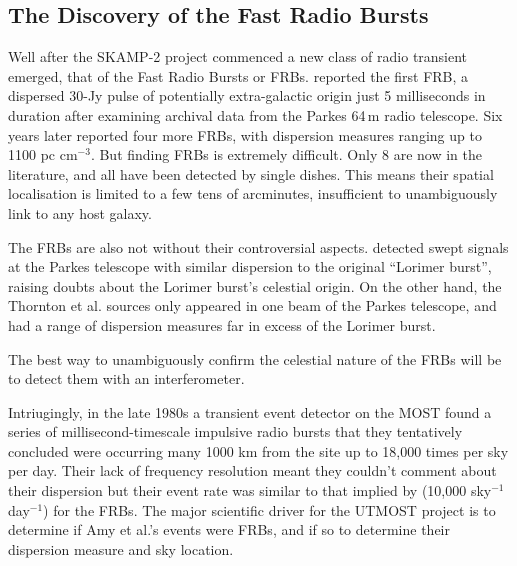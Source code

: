 \subsection{The Discovery of the Fast Radio Bursts}

Well after the SKAMP-2 project commenced a new class of radio transient emerged, that of the Fast Radio Bursts or FRBs. \cite{Lorimer_2007} reported the first FRB, a dispersed 30-Jy pulse of potentially extra-galactic origin just 5 milliseconds in duration after examining archival data from the Parkes 64\,m radio telescope. Six years later \citep{Thornton_2013} reported four more FRBs, with dispersion measures ranging up to 1100 pc cm$^{-3}$. But finding FRBs is extremely difficult. Only 8 are now in the literature, and all have been detected by single dishes. This means their spatial localisation is limited to a few tens of arcminutes, insufficient to unambiguously link to any host galaxy.

The FRBs are also not without their controversial aspects. \cite{Burke_Spolaor_2011} detected swept signals at the Parkes telescope with similar dispersion to the original ``Lorimer burst'', raising doubts about the Lorimer burst's celestial origin. On the other hand, the Thornton et al. sources only appeared in one beam of the Parkes telescope, and had a range of dispersion measures far in excess of the Lorimer burst.

The best way to unambiguously confirm the celestial nature of the FRBs will be to detect them with an interferometer.

 Intriugingly, in the late 1980s a transient event detector on the MOST found a series of millisecond-timescale impulsive radio bursts that they tentatively concluded were occurring many 1000 km from the site up to 18,000 times per sky per day\cite{AMY}. Their lack of frequency resolution meant they couldn't comment about their dispersion but their event rate was similar to that implied by \citep{Thornton_2013} (10,000 sky$^{-1}$ day$^{-1}$) for the FRBs. The major scientific driver for the UTMOST project is to determine if Amy et al.'s events were FRBs, and if so to determine their dispersion measure and sky location.